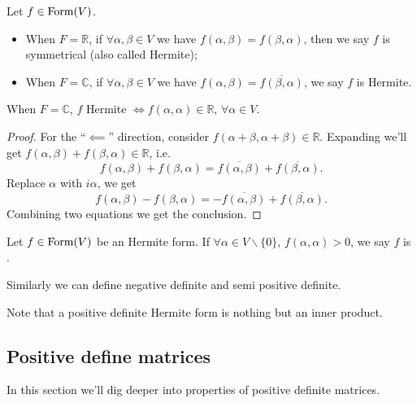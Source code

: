 \begin{definition}
	Let $f\in \operatorname{Form}(V)$.
	\begin{itemize}
		\item When $F = \mathbb{R}$, if $\forall \alpha, \beta \in V$ we have
			$f(\alpha, \beta) = f(\beta, \alpha)$, then we say $f$ is symmetrical
			(also called Hermite);
		\item When $F = \mathbb{C}$, if $\forall \alpha, \beta \in V$ we have
			$f(\alpha, \beta) = \overline{f(\beta, \alpha)}$, we say $f$ is Hermite.
	\end{itemize}
\end{definition}
\begin{proposition}
	When $F = \mathbb{C}$, $f$ Hermite $\iff f(\alpha, \alpha) \in \mathbb{R}$,
	$\forall \alpha\in V$.
\end{proposition}
\begin{proof}[Proof]
    For the ``$\impliedby$'' direction,
	consider $f(\alpha + \beta, \alpha + \beta)\in \mathbb{R}$.
	Expanding we'll get $f(\alpha, \beta)+f(\beta, \alpha) \in \mathbb{R}$, i.e.
	\[
	f(\alpha, \beta) + f(\beta, \alpha) = \overline{f(\alpha, \beta)} +
	\overline{f(\beta, \alpha)}.
	\]
	Replace $\alpha$ with $i\alpha$, we get
	\[
	f(\alpha, \beta) - f(\beta, \alpha) = -\overline{f(\alpha, \beta)} +
	\overline{f(\beta, \alpha)}.
	\]
	Combining two equations we get the conclusion.
\end{proof}

\begin{definition}
	Let $f\in \operatorname{Form}(V)$ be an Hermite form.
	If $\forall \alpha \in V \backslash\{0\}$, $f(\alpha, \alpha) > 0$,
	we say $f$ is .

	Similarly we can define negative definite and semi positive definite.
\end{definition}
Note that a positive definite Hermite form is nothing but an inner product.

\subsection{Positive define matrices}
\label{sub:Positive define matrices}
In this section we'll dig deeper into properties of positive definite matrices.

